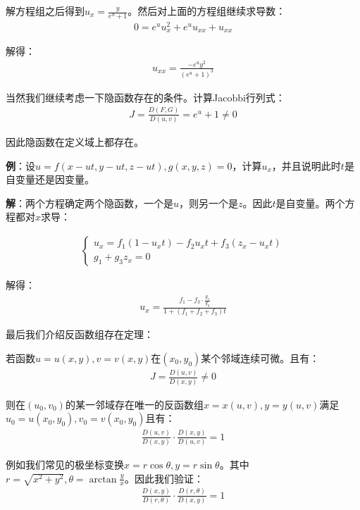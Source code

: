 \documentclass{ctexart}
\let\oldtextbf\textbf %
\renewcommand{\textbf}[1]{\textcolor{btex}{\oldtextbf{#1}}} %
\begin{document}
解方程组之后得到$u_x=\frac{y}{e^u+1}$。然后对上面的方程组继续求导数：
\begin{align*}
    0=e^uu_x^2+e^uu_{xx}+u_{xx}
\end{align*}

解得：
\begin{align*}
    u_{xx}=\frac{-e^uy^2}{(e^u+1)^3}
\end{align*}

当然我们继续考虑一下隐函数存在的条件。计算Jacobbi行列式：
\begin{align*}
    J=\frac{D(F,G)}{D(u,v)}=e^u+1\neq 0
\end{align*}

因此隐函数在定义域上都存在。

\textbf{例}：设$u=f(x-ut,y-ut,z-ut),g(x,y,z)=0$，计算$u_x$，并且说明此时$t$是自变量还是因变量。

\textbf{解}：两个方程确定两个隐函数，一个是$u$，则另一个是$z$。因此$t$是自变量。两个方程都对$x$求导：

\begin{align*}
    \begin{cases}
        u_x=f_1(1-u_xt)-f_2u_xt+f_3(z_x-u_xt)\\
        g_1+g_3z_x=0
    \end{cases}
\end{align*}

解得：
\begin{align*}
    u_x=\frac{f_1-f_3\cdot\frac{g_1}{g_3}}{1+(f_1+f_2+f_3)t}
\end{align*}

最后我们介绍反函数组存在定理：
\begin{tcolorbox}[
    colback=bac1,     %
    colframe=fra1,   %
    coltitle=white,             %
    coltext=tex1,
    title=反函数组存在定理,
    fonttitle=\bfseries,        %
arc=3mm,                     %
breakable
]
若函数$u=u(x,y),v=v(x,y)$在$(x_0,y_0)$某个邻域连续可微。且有：
\begin{align*}
    J=\frac{D(u,v)}{D(x,y)}\neq 0
\end{align*}

则在$(u_0,v_0)$的某一邻域存在唯一的反函数组$x=x(u,v),y=y(u,v)$满足$u_0=u(x_0,y_0),v_0=v(x_0,y_0)$且有：
\begin{align*}
    \frac{D(u,v)}{D(x,y)}\cdot\frac{D(x,y)}{D(u,v)}=1\tag{7-19}
\end{align*}
\end{tcolorbox}

例如我们常见的极坐标变换$x=r\cos\theta,y=r\sin\theta$。其中$r=\sqrt{x^2+y^2},\theta=\arctan\frac{y}{x}$。因此我们验证：
\begin{align*}
    \frac{D(x,y)}{D(r,\theta)}\cdot\frac{D(r,\theta)}{D(x,y)}=1
\end{align*}
\end{document}
